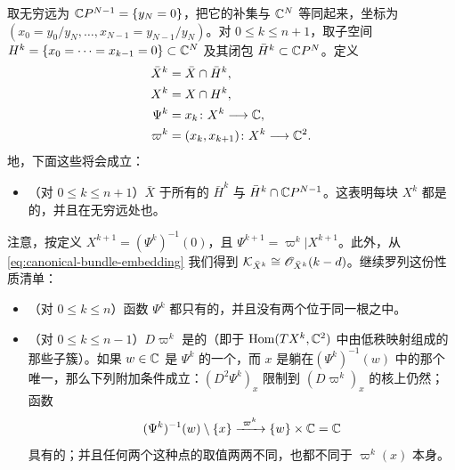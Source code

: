 取无穷远\trHyperplane{}为 $\mathbb{C}P^{N-1}=\{y_N=0\}$，把它的补集与 $\mathbb{C}^N$ 等同起来，坐标为 $(x_0=y_0/y_N,\ldots,x_{N-1}=y_{N-1}/y_N)$。对 $0\le k\le n+1$，取子空间 $H^k=\{x_0=\cdots=x_{k-1}=0\}\subset\mathbb{C}^N$ 及其闭包 $\bar{H}^k\subset\mathbb{C}P^N$。定义
\begin{equation*}
\begin{aligned}
\bar{X}^k&=\bar{X}\cap\bar{H}^k,\\
X^k&=X\cap H^k,\\
\Psi^k&=x_k\colon X^k\longrightarrow\mathbb{C},\\
\varpi^k&=(x_k,x_{k+1})\colon X^k\longrightarrow\mathbb{C}^2.
\end{aligned}
\end{equation*}
\trGeneric{}地，下面这些将会成立：
\begin{itemize}
\item （对 $0\le k\le n+1$）$\bar{X}$ \trTransverse{}于所有的 $\bar{H}^k$ 与 $\bar{H}^k\cap\mathbb{C}P^{N-1}$。这表明每块 $X^k$ 都是\trSmooth{}的，并且在无穷远处也\trSmooth。
\end{itemize}
注意，按定义 $X^{k+1}=(\Psi^k)^{-1}(0)$，且 $\Psi^{k+1}=\varpi^k|X^{k+1}$。此外，从 \eqref{eq:canonical-bundle-embedding} 我们得到 $\mathcal{K}_{\bar{X}^k}\cong\mathscr{O}_{\bar{X}^k}(k-d)$。继续罗列这份\trGeneric{}性质清单：
\begin{itemize}
\item （对 $0\le k\le n$）函数 $\Psi^k$ 都只有\trNondegenerate{}的\trCriticalPoint，并且没有两个位于同一根\trFiber{}之中。
\item （对 $0\le k\le n-1$）$D\varpi^k$ 是\trGeneric{}的（即\trTransverse{}于 $\mathrm{Hom}(TX^k,\mathbb{C}^2)$ 中由低秩\trLinear{}映射组成的那些子簇）。如果 $w\in\mathbb{C}$ 是 $\Psi^k$ 的一个\trCriticalValue，而 $x$ 是躺在\trFiber{}$(\Psi^k)^{-1}(w)$ 中的那个唯一\trCriticalPoint，那么下列附加条件成立：$(D^2\Psi^k)_x$ 限制到 $(D\varpi^k)_x$ 的核上仍然\trNondegenerate；函数
\begin{equation*}
(\Psi^k)^{-1}(w)\setminus\{x\}\xrightarrow{\ \varpi^k\ }\{w\}\times\CC=\CC
\end{equation*}
具有\trNondegenerate{}的\trCriticalPoint；并且任何两个这种点的取值两两不同，也都不同于 $\varpi^k(x)$ 本身。
\end{itemize}
